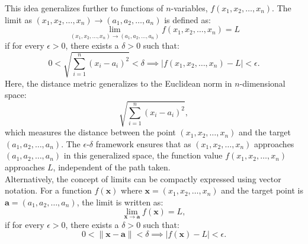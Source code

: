 \noindent This idea generalizes further to functions of \( n \)-variables, \( f(x_1, x_2, \dots, x_n) \). The limit as \( (x_1, x_2, \dots, x_n) \to (a_1, a_2, \dots, a_n) \) is defined as:
\[
\lim_{(x_1, x_2, \dots, x_n) \to (a_1, a_2, \dots, a_n)} f(x_1, x_2, \dots, x_n) = L
\]
if for every \( \epsilon > 0 \), there exists a \( \delta > 0 \) such that:
\[
0 < \sqrt{\sum_{i=1}^n (x_i - a_i)^2} < \delta \implies |f(x_1, x_2, \dots, x_n) - L| < \epsilon.
\]
Here, the distance metric generalizes to the Euclidean norm in \( n \)-dimensional space:
\[
\sqrt{\sum_{i=1}^n (x_i - a_i)^2},
\]
which measures the distance between the point \( (x_1, x_2, \dots, x_n) \) and the target \( (a_1, a_2, \dots, a_n) \). The \(\epsilon\)-\(\delta\) framework ensures that as \( (x_1, x_2, \dots, x_n) \) approaches \( (a_1, a_2, \dots, a_n) \) in this generalized space, the function value \( f(x_1, x_2, \dots, x_n) \) approaches \( L \), independent of the path taken. \\
\noindent Alternatively, the concept of limits can be compactly expressed using vector notation. For a function \( f(\mathbf{x}) \) where \( \mathbf{x} = (x_1, x_2, \dots, x_n) \) and the target point is \( \mathbf{a} = (a_1, a_2, \dots, a_n) \), the limit is written as:
\[
\lim_{\mathbf{x} \to \mathbf{a}} f(\mathbf{x}) = L,
\]
if for every \( \epsilon > 0 \), there exists a \( \delta > 0 \) such that:
\[
0 < \|\mathbf{x} - \mathbf{a}\| < \delta \implies |f(\mathbf{x}) - L| < \epsilon.
\]

